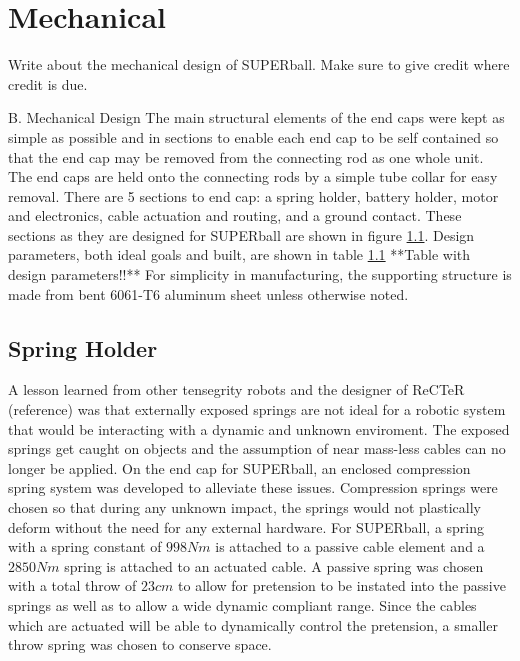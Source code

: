 \section{Mechanical}
Write about the mechanical design of SUPERball. Make sure to give credit where credit is due.

B.  Mechanical Design
The main structural elements of the end caps were
kept as  simple as possible and  in  sections  to  enable  each  end  cap  to  be self  contained  so  that  the  end  cap  may be removed from the connecting rod as one whole unit.
The end  caps  are  held  onto  the  connecting  rods  by  a  simple tube  collar  for  easy  removal. 
There  are  5  sections  to end cap: a spring holder, battery holder, motor and electronics, cable actuation and routing, and a ground contact. 
These sections as they are designed for SUPERball are shown in figure \ref{}. 
Design parameters, both ideal goals and built, are shown in table \ref{} **Table with design parameters!!**
For simplicity in manufacturing, the supporting structure is made from bent 6061-T6 aluminum sheet unless otherwise noted.

\subsection{Spring Holder}
A  lesson  learned  from other tensegrity robots and the designer of ReCTeR (reference) was  that  externally  exposed springs are not ideal for a robotic system that would be interacting with a dynamic and unknown enviroment. 
The exposed springs get caught on objects and the assumption of near mass-less cables  can  no  longer  be  applied.  
On  the  end  cap for SUPERball, an enclosed compression spring system was developed  to  alleviate  these  issues.  
Compression  springs were chosen so that during any unknown impact, the springs would not plastically deform without the need for any external hardware. 
For SUPERball, a spring with a spring constant of \(998 Nm\) is attached to a passive cable element  and  a \(2850 Nm\) spring  is  attached  to  an  actuated cable.  
A  passive  spring was chosen with a total throw of \(23 cm\) to allow for pretension to be instated into the passive springs as well as to allow a wide dynamic compliant range.  
Since the cables which are actuated will be able to dynamically control the pretension, a smaller throw spring was chosen to conserve space.

